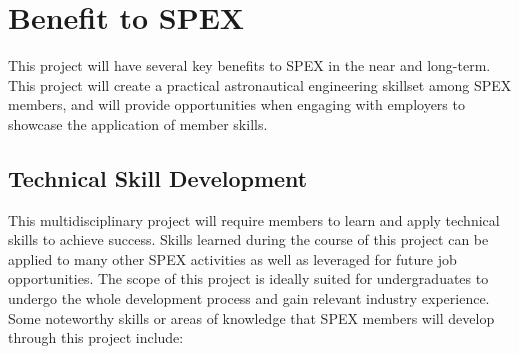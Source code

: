 \documentclass[conference]{IEEEtran} %
\begin{document}


\section{Benefit to SPEX}
\label{sec:benefit}

This project will have several key benefits to SPEX in the near and long-term.
This project will create a practical astronautical engineering skillset among SPEX members, and will provide opportunities when engaging with employers to showcase the application of member skills.


\subsection{Technical Skill Development}
\label{subsec:technicalSkills}
This multidisciplinary project will require members to learn and apply technical skills to achieve success.
Skills learned during the course of this project can be applied to many other SPEX activities as well as leveraged for future job opportunities.
The scope of this project is ideally suited for undergraduates to undergo the whole development process and gain relevant industry experience.  Some noteworthy skills or areas of knowledge that SPEX members will develop through this project include:
\end{document}
